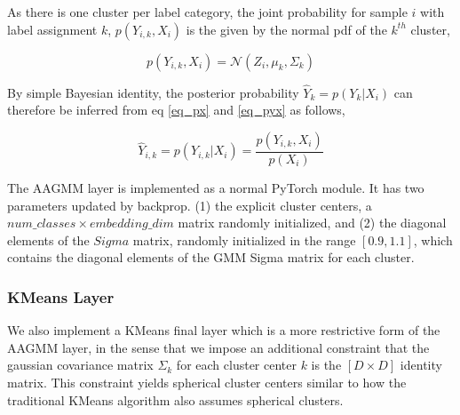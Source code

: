 \documentclass[10pt,twocolumn,letterpaper]{article}
\begin{document}
As there is one cluster per label category, the joint probability for sample $i$ with label assignment $k$, $p(Y_{i,k},X_i)$ is the given by the normal pdf of the $k^{th}$ cluster,

\begin{equation}
	\label{eq_pyx}
	p(Y_{i,k},X_i) = \mathcal{N} (Z_i, \mu_{k}, \Sigma_k) \end{equation}

By simple Bayesian identity, the posterior probability $\hat{Y}_k=p(Y_{k}|X_i)$ can therefore be inferred from eq \ref{eq_px} and \ref{eq_pyx} as follows,

\begin{equation}
	\hat{Y}_{i,k} = p(Y_{i,k}|X_i) = \frac{p(Y_{i,k}, X_i)}{p(X_i)}
\end{equation}

%

%

The AAGMM layer is implemented as a normal PyTorch \cite{pytorch} module.
It has two parameters updated by backprop.
(1) the explicit cluster centers, a $num\_classes \times embedding\_dim$ matrix randomly initialized, and
(2) the diagonal elements of the $Sigma$ matrix, randomly initialized in the range $[0.9, 1.1]$, which contains the diagonal elements of the GMM Sigma matrix for each cluster.

\subsubsection{KMeans Layer}

We also implement a KMeans final layer which is a more restrictive form of the AAGMM layer, in the sense that we impose an additional constraint that the gaussian covariance matrix $\Sigma_k$ for each cluster center $k$ is the $[D \times D]$ identity matrix. 
This constraint yields spherical cluster centers similar to how the traditional KMeans algorithm also assumes spherical clusters.
\end{document}
